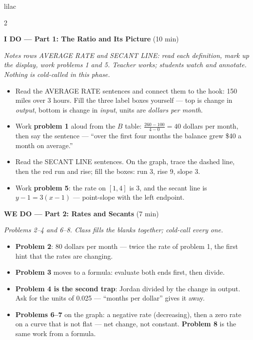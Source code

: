 \documentclass[10pt]{article}
\begin{document}
\begin{skillbox}{lilac}
\begin{multicols}{2}

\textbf{I DO --- Part 1: The Ratio and Its Picture} (10 min)

\textit{Notes rows AVERAGE RATE and SECANT LINE: read each definition, mark up the display,
work problems 1 and 5. Teacher works; students watch and annotate. Nothing is cold-called in
this phase.}
\begin{itemize}
  \item Read the AVERAGE RATE sentences and connect them to the hook: 150 miles over 3 hours.
        Fill the three label boxes yourself --- top is change in \textit{output}, bottom is
        change in \textit{input}, units are \textit{dollars per month}.
  \item Work \textbf{problem 1} aloud from the $B$ table: $\frac{260 - 100}{4 - 0} = 40$
        dollars per month, then say the sentence --- ``over the first four months the balance
        grew \$40 a month on average.''
  \item Read the SECANT LINE sentences. On the graph, trace the dashed line, then the red run
        and rise; fill the boxes: run 3, rise 9, slope 3.
  \item Work \textbf{problem 5}: the rate on $[1, 4]$ is 3, and the secant line is
        $y - 1 = 3(x - 1)$ --- point-slope with the left endpoint.
\end{itemize}

\textbf{WE DO --- Part 2: Rates and Secants} (7 min)

\textit{Problems 2--4 and 6--8. Class fills the blanks together; cold-call every one.}
\begin{itemize}
  \item \textbf{Problem 2}: 80 dollars per month --- twice the rate of problem 1, the first
        hint that the rates are changing.
  \item \textbf{Problem 3} moves to a formula: evaluate both ends first, then divide.
  \item \textbf{Problem 4 is the second trap}: Jordan divided by the change in output. Ask for
        the units of 0.025 --- ``months per dollar'' gives it away.
  \item \textbf{Problems 6--7} on the graph: a negative rate (decreasing), then a zero rate on a
        curve that is not flat --- net change, not constant. \textbf{Problem 8} is the same
        work from a formula.
\end{itemize}


\end{multicols}
\end{skillbox}
\end{document}
